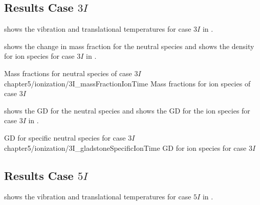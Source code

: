     \subsection{Results Case $3I$ \label{sub:case3I}}

         shows the vibration and translational
        temperatures for case $3I$ in .


         shows the change in mass fraction for the
        neutral species and  shows the density for ion
        species for case $3I$ in .

        {Mass fractions for neutral species of case $3I$\label{fig:3IMassFractionNeutral}} 
        {chapter5/ionization/3I_massFractionIonTime}
        {Mass fractions for ion species of case $3I$\label{fig:3IMassFractionIon}} 

         shows the \gls{GD} for the neutral
        species and  shows the \gls{GD} for the
        ion species for case $3I$ in .

        {\gls{GD} for specific neutral species for case
        $3I$\label{fig:3IGladstoneDaleNeutral}} 
        {chapter5/ionization/3I_gladstoneSpecificIonTime}
        {\gls{GD} for ion species for case $3I$\label{fig:3IGladstoneDaleIon}} 


    \subsection{Results Case $5I$ \label{sub:case5I}}

         shows the vibration and translational
        temperatures for case $5I$ in .

        
